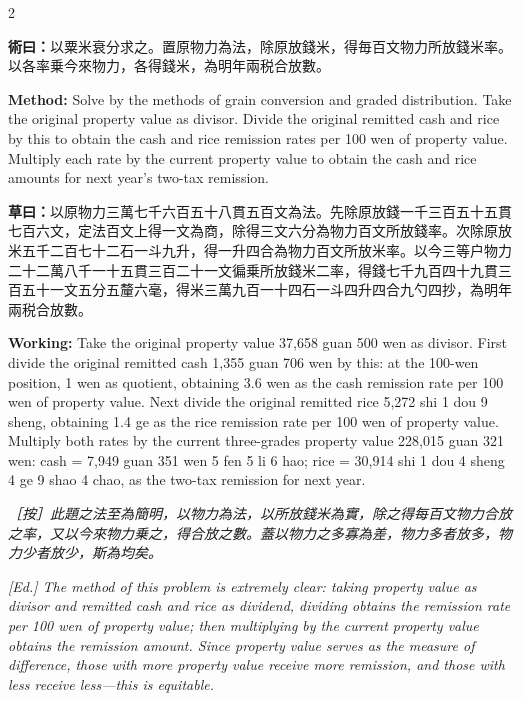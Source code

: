 \documentclass[11pt,a4paper]{article}
\newcommand{\MethodText}[1]{\par\noindent\textbf{\color{methodcolor}術曰：}#1\par}
\newcommand{\WorkingText}[1]{\par\noindent\textbf{草曰：}#1\par}
\newcommand{\EdNoteText}[1]{\par\noindent\textit{\color{ednotecolor}［按］#1}\par}
\newcommand{\MethodEn}[1]{\par\noindent\textbf{\color{methodcolor}Method:} #1\par}
\newcommand{\WorkingEn}[1]{\par\noindent\textbf{Working:} #1\par}
\newcommand{\EdNoteEn}[1]{\par\noindent\textit{\color{ednotecolor}[Ed.] #1}\par}
\begin{document}
\begin{paracol}{2}
\MethodText{以粟米衰分求之。置原物力為法，除原放錢米，得毎百文物力所放錢米率。以各率乗今來物力，各得錢米，為明年兩税合放數。}
\switchcolumn
\MethodEn{Solve by the methods of grain conversion and graded distribution. Take the original property value as divisor. Divide the original remitted cash and rice by this to obtain the cash and rice remission rates per 100 wen of property value. Multiply each rate by the current property value to obtain the cash and rice amounts for next year's two-tax remission.}
\switchcolumn*

\WorkingText{以原物力三萬七千六百五十八貫五百文為法。先除原放錢一千三百五十五貫七百六文，定法百文上得一文為商，除得三文六分為物力百文所放錢率。次除原放米五千二百七十二石一斗九升，得一升四合為物力百文所放米率。以今三等户物力二十二萬八千一十五貫三百二十一文徧乗所放錢米二率，得錢七千九百四十九貫三百五十一文五分五釐六毫，得米三萬九百一十四石一斗四升四合九勺四抄，為明年兩税合放數。}
\switchcolumn
\WorkingEn{Take the original property value 37,658 guan 500 wen as divisor. First divide the original remitted cash 1,355 guan 706 wen by this: at the 100-wen position, 1 wen as quotient, obtaining 3.6 wen as the cash remission rate per 100 wen of property value. Next divide the original remitted rice 5,272 shi 1 dou 9 sheng, obtaining 1.4 ge as the rice remission rate per 100 wen of property value. Multiply both rates by the current three-grades property value 228,015 guan 321 wen: cash = 7,949 guan 351 wen 5 fen 5 li 6 hao; rice = 30,914 shi 1 dou 4 sheng 4 ge 9 shao 4 chao, as the two-tax remission for next year.}
\switchcolumn*

\EdNoteText{此題之法至為簡明，以物力為法，以所放錢米為實，除之得每百文物力合放之率，又以今來物力乗之，得合放之數。蓋以物力之多寡為差，物力多者放多，物力少者放少，斯為均矣。}
\switchcolumn
\EdNoteEn{The method of this problem is extremely clear: taking property value as divisor and remitted cash and rice as dividend, dividing obtains the remission rate per 100 wen of property value; then multiplying by the current property value obtains the remission amount. Since property value serves as the measure of difference, those with more property value receive more remission, and those with less receive less---this is equitable.}

\end{paracol}
\end{document}
